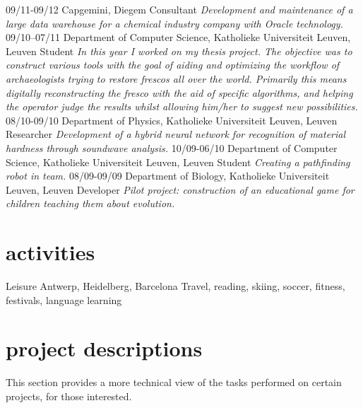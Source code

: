 \documentclass[]{friggeri-cv}
\begin{document}
\begin{entrylist}
  \entry
    {09/11-09/12}
    {Capgemini, Diegem}
    {Consultant}
    {\emph{Development and maintenance of a large data warehouse for a chemical industry company with Oracle technology.}}
  \entry
    {09/10--07/11}
    {Department of Computer Science, Katholieke Universiteit Leuven, Leuven}
    {Student}
    {\emph{In this year I worked on my thesis project. The objective was to construct various tools with the goal of aiding and optimizing the workflow of archaeologists trying to restore frescos all over the world. Primarily this means digitally reconstructing the fresco with the aid of specific algorithms, and helping the operator judge the results whilst allowing him/her to suggest new possibilities.}}
  \entry
    {08/10-09/10}
    {Department of Physics, Katholieke Universiteit Leuven, Leuven}
    {Researcher}
    {\emph{Development of a hybrid neural network for recognition of material hardness through soundwave analysis.}}
  \entry
    {10/09-06/10}
    {Department of Computer Science, Katholieke Universiteit Leuven, Leuven}
    {Student}
    {\emph{Creating a pathfinding robot in team.}}
  \entry
    {08/09-09/09}
    {Department of Biology, Katholieke Universiteit Leuven, Leuven}
    {Developer}
    {\emph{Pilot project: construction of an educational game for children teaching them about evolution.}}
\end{entrylist}

\section{activities}

\begin{entrylist}
  \entry
    {}
    {Leisure}
    {Antwerp, Heidelberg, Barcelona}
    {Travel, reading, skiing, soccer, fitness, festivals, language learning}
\end{entrylist}

\section{project descriptions}

This section provides a more technical view of the tasks performed on certain projects, for those interested.
\end{document}
